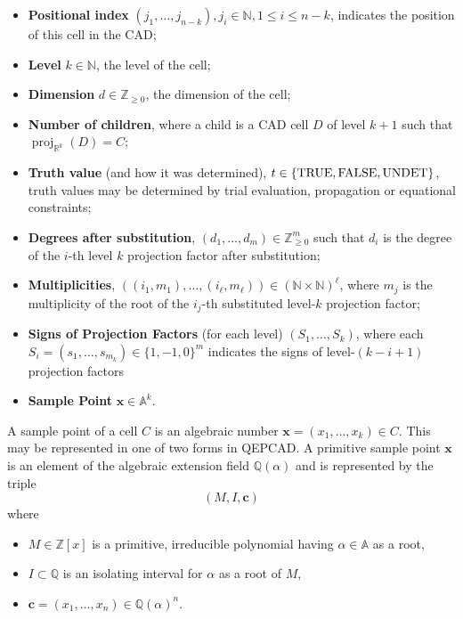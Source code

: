 \documentclass[
]{book}
\providecommand{\tightlist}{%
  \setlength{\itemsep}{0pt}\setlength{\parskip}{0pt}}
\theoremstyle{definition}
\theoremstyle{definition}
\theoremstyle{definition}
\theoremstyle{definition}
\theoremstyle{remark}
\begin{document}
\begin{itemize}
\tightlist
\item
  \textbf{Positional index} \((j_1,\ldots,j_{n-k}), j_i \in \mathbb{N}, 1 \le i \le n-k\), indicates the position of this cell in the CAD;
\item
  \textbf{Level} \(k \in \mathbb{N}\), the level of the cell;
\item
  \textbf{Dimension} \(d \in \mathbb{Z}_{\ge 0}\), the dimension of the cell;
\item
  \textbf{Number of children}, where a child is a CAD cell \(D\) of level \(k+1\) such that \({\operatorname{proj}_{\mathbb{R}^{k}}}(D) = C\);
\item
  \textbf{Truth value} (and how it was determined), \(t \in \{ \rm{TRUE, FALSE, UNDET} \}\), truth values may be determined by trial evaluation, propagation or equational constraints;
\item
  \textbf{Degrees after substitution}, \((d_1,\ldots,d_m) \in \mathbb{Z}_{\ge 0}^m\) such that \(d_i\) is the degree of the \(i\)-th level \(k\) projection factor after substitution;
\item
  \textbf{Multiplicities}, \(((i_1,m_1),\ldots,(i_{\ell},m_{\ell})) \in (\mathbb{N}\times \mathbb{N})^\ell\), where \(m_j\) is the multiplicity of the root of the \(i_j\)-th substituted level-\(k\) projection factor;
\item
  \textbf{Signs of Projection Factors} (for each level) \((S_1,\ldots,S_k)\), where each \(S_i = (s_1,\ldots,s_{m_k}) \in \{ 1,-1,0 \}^m\) indicates the signs of level-\((k-i+1)\) projection factors
\item
  \textbf{Sample Point} \(\mathbf{x} \in \mathbb{A}^k\).
\end{itemize}

A sample point of a cell \(C\) is an algebraic number \(\mathbf{x} = (x_1,\ldots,x_k) \in C\). This may be represented in one of two forms in QEPCAD.
A primitive sample point \(\mathbf{x}\) is an element of the algebraic extension field \(\mathbb{Q}(\alpha)\) and is represented by the triple
\[
(M, I, \mathbf{c})
\]
where

\begin{itemize}
\tightlist
\item
  \(M \in \mathbb{Z}[x]\) is a primitive, irreducible polynomial having \(\alpha \in \mathbb{A}\) as a root,
\item
  \(I \subset \mathbb{Q}\) is an isolating interval for \(\alpha\) as a root of \(M\),
\item
  \(\mathbf{c} = (x_1,\ldots,x_n) \in \mathbb{Q}(\alpha)^n\).
\end{itemize}
\end{document}
